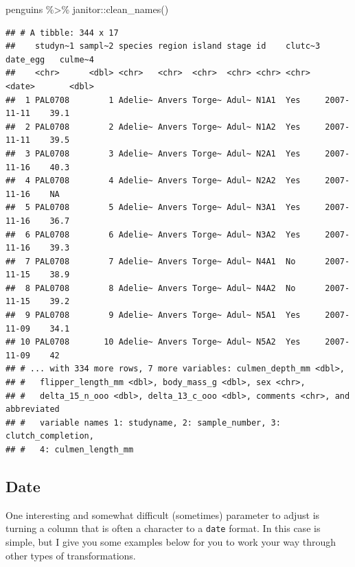 \documentclass[
]{book}
\newenvironment{Shaded}{\begin{snugshade}}{\end{snugshade}}
\newcommand{\FunctionTok}[1]{\textcolor[rgb]{0.00,0.00,0.00}{#1}}
\newcommand{\NormalTok}[1]{#1}
\newcommand{\OtherTok}[1]{\textcolor[rgb]{0.56,0.35,0.01}{#1}}
\newcommand{\SpecialCharTok}[1]{\textcolor[rgb]{0.00,0.00,0.00}{#1}}
\begin{document}
\begin{Shaded}
\begin{Highlighting}[]
\NormalTok{penguins }\SpecialCharTok{\%\textgreater{}\%} 
\NormalTok{  janitor}\SpecialCharTok{::}\FunctionTok{clean\_names}\NormalTok{()}
\end{Highlighting}
\end{Shaded}

\begin{verbatim}
## # A tibble: 344 x 17
##    studyn~1 sampl~2 species region island stage id    clutc~3 date_egg   culme~4
##    <chr>      <dbl> <chr>   <chr>  <chr>  <chr> <chr> <chr>   <date>       <dbl>
##  1 PAL0708        1 Adelie~ Anvers Torge~ Adul~ N1A1  Yes     2007-11-11    39.1
##  2 PAL0708        2 Adelie~ Anvers Torge~ Adul~ N1A2  Yes     2007-11-11    39.5
##  3 PAL0708        3 Adelie~ Anvers Torge~ Adul~ N2A1  Yes     2007-11-16    40.3
##  4 PAL0708        4 Adelie~ Anvers Torge~ Adul~ N2A2  Yes     2007-11-16    NA  
##  5 PAL0708        5 Adelie~ Anvers Torge~ Adul~ N3A1  Yes     2007-11-16    36.7
##  6 PAL0708        6 Adelie~ Anvers Torge~ Adul~ N3A2  Yes     2007-11-16    39.3
##  7 PAL0708        7 Adelie~ Anvers Torge~ Adul~ N4A1  No      2007-11-15    38.9
##  8 PAL0708        8 Adelie~ Anvers Torge~ Adul~ N4A2  No      2007-11-15    39.2
##  9 PAL0708        9 Adelie~ Anvers Torge~ Adul~ N5A1  Yes     2007-11-09    34.1
## 10 PAL0708       10 Adelie~ Anvers Torge~ Adul~ N5A2  Yes     2007-11-09    42  
## # ... with 334 more rows, 7 more variables: culmen_depth_mm <dbl>,
## #   flipper_length_mm <dbl>, body_mass_g <dbl>, sex <chr>,
## #   delta_15_n_ooo <dbl>, delta_13_c_ooo <dbl>, comments <chr>, and abbreviated
## #   variable names 1: studyname, 2: sample_number, 3: clutch_completion,
## #   4: culmen_length_mm
\end{verbatim}

\hypertarget{date}{%
\subsection{Date}\label{date}}

One interesting and somewhat difficult (sometimes) parameter to adjust is turning a column that is often a character to a \texttt{date} format.
In this case is simple, but I give you some examples below for you to work your way through other types of transformations.

\begin{Shaded}
\end{Shaded}
\end{document}
